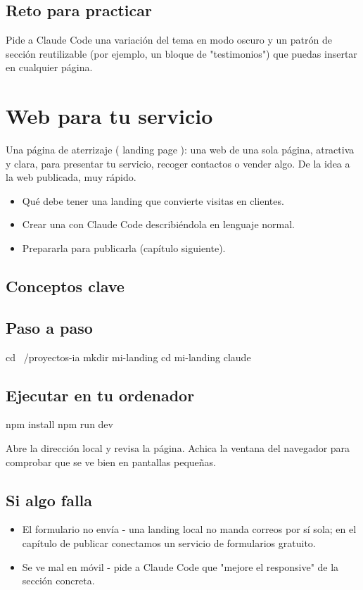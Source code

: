 \documentclass[11pt,a4paper]{book}
\begin{document}
\section{Reto para practicar}
Pide a Claude Code una variación del tema en modo oscuro y un patrón de sección reutilizable (por ejemplo, un bloque de "testimonios") que puedas insertar en cualquier página.

\chapter{Web para tu servicio}
Una página de aterrizaje ( landing page ): una web de una sola página, atractiva y clara, para presentar tu servicio, recoger contactos o vender algo. De la idea a la web publicada, muy rápido.

\begin{itemize}\item Qué debe tener una landing que convierte visitas en clientes.\end{itemize}
\begin{itemize}\item Crear una con Claude Code describiéndola en lenguaje normal.\end{itemize}
\begin{itemize}\item Prepararla para publicarla (capítulo siguiente).\end{itemize}
\section{Conceptos clave}
\section{Paso a paso}
\begin{codebox}
cd ~/proyectos-ia
mkdir mi-landing
cd mi-landing
claude
\end{codebox}
\section{Ejecutar en tu ordenador}
\begin{codebox}
npm install
npm run dev
\end{codebox}
Abre la dirección local y revisa la página. Achica la ventana del navegador para comprobar que se ve bien en pantallas pequeñas.

\section{Si algo falla}
\begin{itemize}\item El formulario no envía - una landing local no manda correos por sí sola; en el capítulo de publicar conectamos un servicio de formularios gratuito.\end{itemize}
\begin{itemize}\item Se ve mal en móvil - pide a Claude Code que "mejore el responsive" de la sección concreta.\end{itemize}
\end{document}
